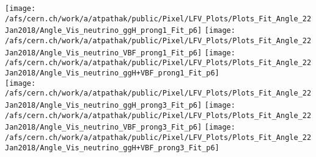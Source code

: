 \documentclass{beamer}
\begin{document}
\begin{frame}
\begin{normalsize}
\begin{center}
\texttt{[image: /afs/cern.ch/work/a/atpathak/public/Pixel/LFV\_Plots/Plots\_Fit\_Angle\_22Jan2018/Angle\_Vis\_neutrino\_ggH\_prong1\_Fit\_p6]}
\texttt{[image: /afs/cern.ch/work/a/atpathak/public/Pixel/LFV\_Plots/Plots\_Fit\_Angle\_22Jan2018/Angle\_Vis\_neutrino\_VBF\_prong1\_Fit\_p6]}
\texttt{[image: /afs/cern.ch/work/a/atpathak/public/Pixel/LFV\_Plots/Plots\_Fit\_Angle\_22Jan2018/Angle\_Vis\_neutrino\_ggH+VBF\_prong1\_Fit\_p6]}\\
\texttt{[image: /afs/cern.ch/work/a/atpathak/public/Pixel/LFV\_Plots/Plots\_Fit\_Angle\_22Jan2018/Angle\_Vis\_neutrino\_ggH\_prong3\_Fit\_p6]}
\texttt{[image: /afs/cern.ch/work/a/atpathak/public/Pixel/LFV\_Plots/Plots\_Fit\_Angle\_22Jan2018/Angle\_Vis\_neutrino\_VBF\_prong3\_Fit\_p6]}
\texttt{[image: /afs/cern.ch/work/a/atpathak/public/Pixel/LFV\_Plots/Plots\_Fit\_Angle\_22Jan2018/Angle\_Vis\_neutrino\_ggH+VBF\_prong3\_Fit\_p6]}\\
\end{center}
\end{normalsize}
\end {frame}
\end{document}
